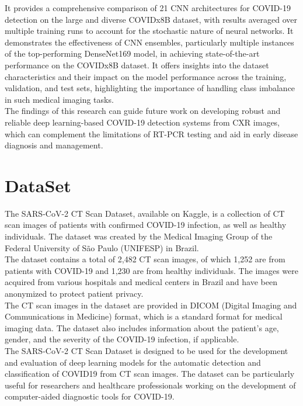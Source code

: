 \documentclass[12pt, a4paper]{report}
\begin{document}
It provides a comprehensive comparison of 21 CNN architectures for COVID-19 detection on the large and diverse COVIDx8B dataset, with results averaged over multiple training runs to account for the stochastic nature of neural networks. It demonstrates the effectiveness of CNN ensembles, particularly multiple instances of the top-performing DenseNet169 model, in achieving state-of-the-art performance on the COVIDx8B dataset. It offers insights into the dataset characteristics and their impact on the model performance across the training, validation, and test sets, highlighting the importance of handling class imbalance in such medical imaging tasks.\\

The findings of this research can guide future work on developing robust and reliable deep learning-based COVID-19 detection systems from CXR images, which can complement the limitations of RT-PCR testing and aid in early disease diagnosis and management.

\chapter{DataSet}
The SARS-CoV-2 CT Scan Dataset, available on Kaggle, is a collection of CT scan images of patients with confirmed COVID-19 infection, as well as healthy individuals. The dataset was created by the Medical Imaging Group of the Federal University of São Paulo (UNIFESP) in Brazil.\\

The dataset contains a total of 2,482 CT scan images, of which 1,252 are from patients with COVID-19 and 1,230 are from healthy individuals. The images were acquired from various hospitals and medical centers in Brazil and have been anonymized to protect patient privacy.\\

The CT scan images in the dataset are provided in DICOM (Digital Imaging and
Communications in Medicine) format, which is a standard format for medical imaging data. The dataset also includes information about the patient's age, gender, and the severity of the COVID-19 infection, if applicable.\\

The SARS-CoV-2 CT Scan Dataset is designed to be used for the development and
evaluation of deep learning models for the automatic detection and classification of COVID19 from CT scan images. The dataset can be particularly useful for researchers and healthcare professionals working on the development of computer-aided diagnostic tools for COVID-19.\\
\end{document}
